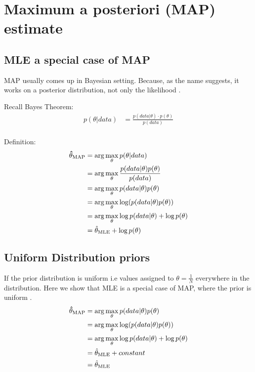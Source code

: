 \chapter{Maximum a posteriori (MAP) estimate}

\section{MLE a special case of MAP}

MAP usually comes up in Bayesian setting. Because, as the name suggests, it works on a posterior distribution, not only the likelihood \cite{mle-map}.

Recall Bayes Theorem:
\begin{equation}
\begin{split}
    p(\theta | data) & = \frac{p(data | \theta) \cdot p(\theta)}{p(data)} \\
\end{split}
\end{equation}


Definition:
\begin{equation}
    \begin{split}
    {\bf \hat{\theta}_{\text{MAP}}} &= \arg\max_{\bf \theta} p(\theta | data) \\
&= \arg\max_{\bf \theta} \frac{p(data | \theta) p(\theta)}{p(data)} \\
&= \arg\max_{\bf \theta} p(data | \theta) p(\theta) \\
&= \arg\max_{\bf \theta} \log(p(data | \theta) p(\theta)) \\
&= \arg\max_{\bf \theta} \log p(data | \theta) + \log p(\theta)  \\
&= \hat{\theta}_{\text{MLE}} + \log p(\theta)  \\
    \end{split}
\end{equation}

\section{Uniform Distribution priors}
If the prior distribution is uniform i.e values assigned to $\theta = \frac{1}{N}$ everywhere in the distribution. Here we show that MLE is a special case of MAP, where the prior is uniform \cite{mle-map}. 
\begin{equation}
    \begin{split}
    {\bf \hat{\theta}_{\text{MAP}}} &= \arg\max_{\bf \theta} p(data | \theta) p(\theta) \\
&= \arg\max_{\bf \theta} \log(p(data | \theta) p(\theta)) \\
&= \arg\max_{\bf \theta} \log p(data | \theta) + \log p(\theta)  \\
&= \hat{\theta}_{\text{MLE}} + constant  \\
&= \hat{\theta}_{\text{MLE}}  \\
    \end{split}
\end{equation}


